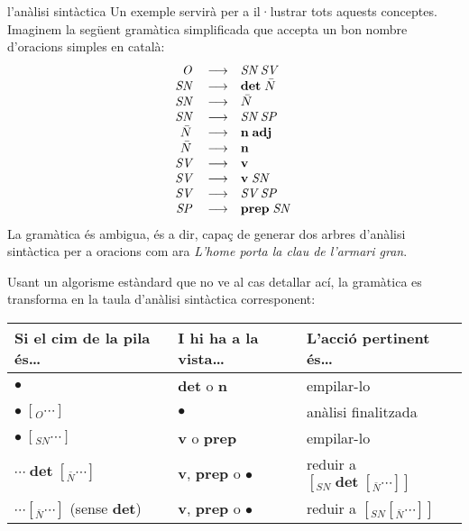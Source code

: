 \begin{persabermes}{l'anàlisi sintàctica}
  Un exemple servirà per a il·lustrar tots aquests conceptes. Imaginem
  la següent gramàtica simplificada que accepta un bon nombre
  d'oracions simples en català\label{pg:gramsenz}:
  $$
  \begin{array}{rcl}
  \mbox{\em O}\; &\longrightarrow & \mbox{\em SN}\; \mbox{\em SV}\; \\
  \mbox{\em SN}\; &\longrightarrow & \mbox{\bf det}\; \mbox{\em $\bar{N}$}\; \\
  \mbox{\em SN}\; &\longrightarrow & \mbox{\em $\bar{N}$}\; \\
  \mbox{\em SN}\; &\longrightarrow & \mbox{\em SN}\; \mbox{\em SP}\; \\
  \mbox{\em $\bar{N}$}\; &\longrightarrow & \mbox{\bf n}\; \mbox{\bf adj}\; \\
  \mbox{\em $\bar{N}$}\; &\longrightarrow & \mbox{\bf n}\; \\
  \mbox{\em SV}\; &\longrightarrow & \mbox{\bf v}\; \\
  \mbox{\em SV}\; &\longrightarrow & \mbox{\bf v}\; \mbox{\em SN}\; \\
  \mbox{\em SV}\; &\longrightarrow & \mbox{\em SV}\; \mbox{\em SP}\; \\
  \mbox{\em SP}\; &\longrightarrow & \mbox{\bf prep}\; \mbox{\em SN}\; \\
  \end{array}
  $$
  La gramàtica és ambigua, és a dir, capaç de generar dos arbres
  d'anàlisi sintàctica per a oracions com ara \emph{L'home porta la
    clau de l'armari gran}.

  Usant un algorisme estàndard que no ve al cas detallar ací, la
  gramàtica es transforma en la taula d'anàlisi sintàctica
  corresponent:

  \begin{center}
    \begin{tabular}{l|l|l}
      \hline
      \textsf{Si el cim de la pila és\ldots} & \textsf{I hi ha a la vista\ldots} & \textsf{L'acció pertinent
        és\ldots} \\
      \hline
      $\bullet$             & \textbf{det} o \textbf{n} & empilar-lo \\
      \hline
      $\bullet\; [_O \cdots ]$ & $\bullet$ & anàlisi finalitzada \\
      \hline 
      $\bullet\; [_{SN} \cdots ]$  & \textbf{v} o \textbf{prep} & empilar-lo \\

      \hline
  
      $\cdots\; \textbf{det} \; [_{\bar{N}} \cdots ]$  & \textbf{v},
      \textbf{prep} o $\bullet$ &reduir a $[_{SN}\;
      \textbf{det}\;[_{\bar{N}} \cdots ] ]$ \\
      \hline
      $\cdots [_{\bar{N}} \cdots ]$ (sense \textbf{det})  & \textbf{v}, \textbf{prep}
      o $\bullet$ & reduir a $[_{SN}
      [_{\bar{N}} \cdots ] ]$ \\


\end{tabular}
\end{center}
\end{persabermes}
